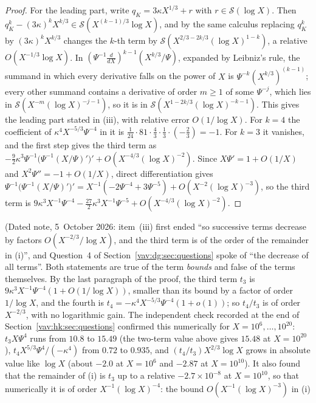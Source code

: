 \documentclass[11pt]{article}
\theoremstyle{remark}\newtheorem{remark}[theorem]{Remark}
\begin{document}
\begin{proof}
For the leading part, write $q_K=3\kappa X^{1/3}+r$ with
$r\in\mathcal S(\log X)$. Then
$q_K^k-(3\kappa)^kX^{k/3}\in\mathcal S(X^{(k-1)/3}\log X)$, and by the same
calculus replacing $q_K^k$ by $(3\kappa)^kX^{k/3}$ changes the $k$-th term
by $\mathcal S(X^{2/3-2k/3}(\log X)^{1-k})$, a relative
$O(X^{-1/3}\log X)$. In $(\Psi^{-1}\frac d{dX})^{k-1}(X^{k/3}/\Psi)$, expanded
by Leibniz's rule, the summand in which every derivative falls on the power
of $X$ is $\Psi^{-k}(X^{k/3})^{(k-1)}$; every other summand contains a
derivative of order $m\ge1$ of some $\Psi^{-j}$, which lies in
$\mathcal S(X^{-m}(\log X)^{-j-1})$, so it is in
$\mathcal S(X^{1-2k/3}(\log X)^{-k-1})$. This gives the leading part stated
in (iii), with relative error $O(1/\log X)$. For $k=4$ the coefficient of
$\kappa^4X^{-5/3}\Psi^{-4}$ in it is
$\frac1{24}\cdot81\cdot\frac43\cdot\frac13\cdot(-\frac23)=-1$. For $k=3$ it
vanishes, and the first step gives the third term as
$-\frac92\kappa^3\Psi^{-1}\bigl(\Psi^{-1}(X/\Psi)'\bigr)'
+O(X^{-4/3}(\log X)^{-2})$. Since $X\Psi'=1+O(1/X)$ and
$X^2\Psi''=-1+O(1/X)$, direct differentiation gives
$\Psi^{-1}\bigl(\Psi^{-1}(X/\Psi)'\bigr)'
=X^{-1}(-2\Psi^{-4}+3\Psi^{-5})+O(X^{-2}(\log X)^{-3})$, so the third term
is $9\kappa^3X^{-1}\Psi^{-4}-\frac{27}2\kappa^3X^{-1}\Psi^{-5}
+O(X^{-4/3}(\log X)^{-2})$.
\end{proof}
\noindent(Dated note, 5~October 2026: item~(iii) first ended ``so successive
terms decrease by factors $O(X^{-2/3}/\log X)$, and the third term is of the
order of the remainder in (i)'', and Question~4 of
Section~\ref{vav:dg:sec:questions} spoke of ``the decrease of all terms''.
Both statements are true of the term \emph{bounds} and false of the terms
themselves. By the last paragraph of the proof, the third term $t_3$ is
$9\kappa^3X^{-1}\Psi^{-4}(1+O(1/\log X))$, smaller than its bound by a
factor of order $1/\log X$, and the fourth is
$t_4=-\kappa^4X^{-5/3}\Psi^{-4}(1+o(1))$; so $t_4/t_3$ is of order
$X^{-2/3}$, with no logarithmic gain. The independent check recorded at the
end of Section~\ref{vav:hk:sec:questions} confirmed this numerically for
$X=10^6,\ldots,10^{20}$: $t_3X\Psi^4$ runs from $10.8$ to $15.49$ (the
two-term value above gives $15.48$ at $X=10^{20}$),
$t_4X^{5/3}\Psi^4/(-\kappa^4)$ from $0.72$ to $0.935$, and
$(t_4/t_3)X^{2/3}\log X$ grows in absolute value like $\log X$ (about
$-2.0$ at $X=10^6$ and $-2.87$ at $X=10^{10}$). It also found that the remainder of (i) is $t_3$ up
to a relative $-2.7\times10^{-8}$ at $X=10^{10}$, so that numerically it is
of order $X^{-1}(\log X)^{-4}$: the bound $O(X^{-1}(\log X)^{-3})$ in (i)
\end{document}
